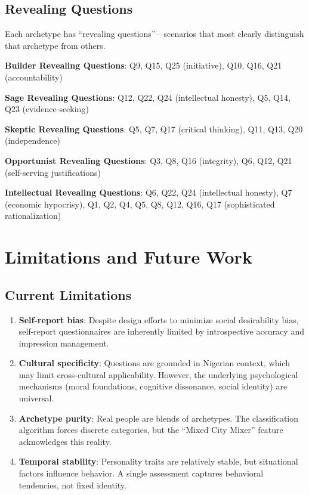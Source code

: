\documentclass[11pt,a4paper]{article}
\begin{document}
\subsection{Revealing Questions}

Each archetype has ``revealing questions''—scenarios that most clearly distinguish that archetype from others.

\textbf{Builder Revealing Questions}: Q9, Q15, Q25 (initiative), Q10, Q16, Q21 (accountability)

\textbf{Sage Revealing Questions}: Q12, Q22, Q24 (intellectual honesty), Q5, Q14, Q23 (evidence-seeking)

\textbf{Skeptic Revealing Questions}: Q5, Q7, Q17 (critical thinking), Q11, Q13, Q20 (independence)

\textbf{Opportunist Revealing Questions}: Q3, Q8, Q16 (integrity), Q6, Q12, Q21 (self-serving justifications)

\textbf{Intellectual Revealing Questions}: Q6, Q22, Q24 (intellectual honesty), Q7 (economic hypocrisy), Q1, Q2, Q4, Q5, Q8, Q12, Q16, Q17 (sophisticated rationalization)

\section{Limitations and Future Work}

\subsection{Current Limitations}

\begin{enumerate}[leftmargin=*]
    \item \textbf{Self-report bias}: Despite design efforts to minimize social desirability bias, self-report questionnaires are inherently limited by introspective accuracy and impression management.
    
    \item \textbf{Cultural specificity}: Questions are grounded in Nigerian context, which may limit cross-cultural applicability. However, the underlying psychological mechanisms (moral foundations, cognitive dissonance, social identity) are universal.
    
    \item \textbf{Archetype purity}: Real people are blends of archetypes. The classification algorithm forces discrete categories, but the ``Mixed City Mixer'' feature acknowledges this reality.
    
    \item \textbf{Temporal stability}: Personality traits are relatively stable, but situational factors influence behavior. A single assessment captures behavioral tendencies, not fixed identity.
\end{enumerate}
\end{document}
